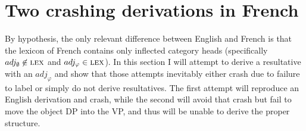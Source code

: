 \documentclass[MilwayThesis]{subfiles}
\begin{document}
\section{Two crashing derivations in French}
By hypothesis, the only relevant difference between English and French is that the lexicon of French contains only inflected category heads (specifically $adj_\emptyset \centernot\in \textsc{lex}$ and $adj_\varphi \in \textsc{lex}$).
In this section I will attempt to derive a resultative with an $adj_\varphi$ and show that those attempts inevitably either crash due to failure to label or simply do not derive resultatives.
The first attempt will reproduce an English derivation and crash, while the second will avoid that crash but fail to move the object DP into the VP, and thus will be unable to derive the proper structure.
\end{document}
